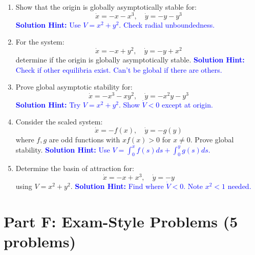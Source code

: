 \documentclass[12pt]{article}
\newcommand{\solution}[1]{\textcolor{blue}{\textbf{Solution Hint:} #1}}
\begin{document}
\begin{enumerate}[resume]
\item Show that the origin is globally asymptotically stable for:
$$\dot{x} = -x - x^3, \quad \dot{y} = -y - y^3$$
\solution{Use $V = x^2 + y^2$. Check radial unboundedness.}

\item For the system:
$$\dot{x} = -x + y^2, \quad \dot{y} = -y + x^2$$
determine if the origin is globally asymptotically stable.
\solution{Check if other equilibria exist. Can't be global if there are others.}

\item Prove global asymptotic stability for:
$$\dot{x} = -x^3 - xy^2, \quad \dot{y} = -x^2y - y^3$$
\solution{Try $V = x^2 + y^2$. Show $\dot{V} < 0$ except at origin.}

\item Consider the scaled system:
$$\dot{x} = -f(x), \quad \dot{y} = -g(y)$$
where $f,g$ are odd functions with $xf(x) > 0$ for $x \neq 0$. Prove global stability.
\solution{Use $V = \int_0^x f(s)ds + \int_0^y g(s)ds$.}

\item Determine the basin of attraction for:
$$\dot{x} = -x + x^3, \quad \dot{y} = -y$$
using $V = x^2 + y^2$.
\solution{Find where $\dot{V} < 0$. Note $x^2 < 1$ needed.}
\end{enumerate}

\section*{Part F: Exam-Style Problems (5 problems)}
\end{document}
